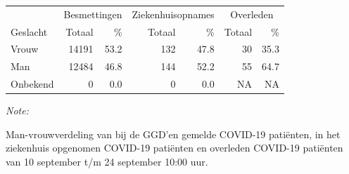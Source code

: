 \documentclass[
  english,
  man,floatsintext]{apa6}
\begin{document}
\begin{table}
\centering\begingroup\fontsize{11}{13}\selectfont

\begin{threeparttable}
\begin{tabular}{lrrrrrr}
\toprule
\multicolumn{1}{c}{ } & \multicolumn{2}{c}{Besmettingen} & \multicolumn{2}{c}{Ziekenhuisopnames} & \multicolumn{2}{c}{Overleden} \\
\cmidrule(l{3pt}r{3pt}){2-3} \cmidrule(l{3pt}r{3pt}){4-5} \cmidrule(l{3pt}r{3pt}){6-7}
Geslacht & Totaal & \% & Totaal & \% & Totaal & \%\\
\midrule
Vrouw & 14191 & 53.2 & 132 & 47.8 & 30 & 35.3\\
Man & 12484 & 46.8 & 144 & 52.2 & 55 & 64.7\\
Onbekend & 0 & 0.0 & 0 & 0.0 & NA & NA\\
\bottomrule
\end{tabular}
\begin{tablenotes}
\item \textit{Note: } 
\item Man-vrouwverdeling van bij de GGD’en gemelde COVID-19 patiënten, in het ziekenhuis opgenomen COVID-19 patiënten en overleden COVID-19 patiënten van 10 september t/m 24 september 10:00 uur.
\end{tablenotes}
\end{threeparttable}
\endgroup{}
\end{table}
\newpage
\end{document}
